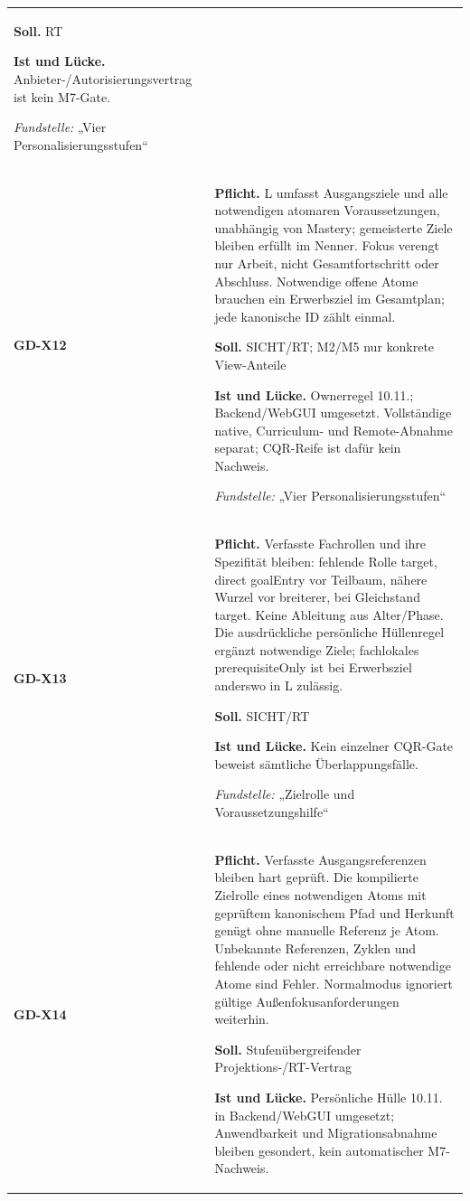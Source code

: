 \begin{longtable}{@{}P{20mm}P{128mm}@{}}
\textbf{Soll.} RT\par\smallskip
\textbf{Ist und Lücke.} Anbieter-/Autorisierungsvertrag ist kein M7-Gate.\par\smallskip
\emph{Fundstelle:} „Vier Personalisierungsstufen“\\\addlinespace[5pt]
\label{rule:GD-X12}\textbf{GD-X12} &
\textbf{Pflicht.} L umfasst Ausgangsziele und alle notwendigen atomaren Voraussetzungen, unabhängig von Mastery; gemeisterte Ziele bleiben erfüllt im Nenner. Fokus verengt nur Arbeit, nicht Gesamtfortschritt oder Abschluss. Notwendige offene Atome brauchen ein Erwerbsziel im Gesamtplan; jede kanonische ID zählt einmal.\par\smallskip
\textbf{Soll.} SICHT/RT; M2/M5 nur konkrete View-Anteile\par\smallskip
\textbf{Ist und Lücke.} Ownerregel 10.11.; Backend/WebGUI umgesetzt. Vollständige native, Curriculum- und Remote-Abnahme separat; CQR-Reife ist dafür kein Nachweis.\par\smallskip
\emph{Fundstelle:} „Vier Personalisierungsstufen“\\\addlinespace[5pt]
\label{rule:GD-X13}\textbf{GD-X13} &
\textbf{Pflicht.} Verfasste Fachrollen und ihre Spezifität bleiben: fehlende Rolle target, direct goalEntry vor Teilbaum, nähere Wurzel vor breiterer, bei Gleichstand target. Keine Ableitung aus Alter/Phase. Die ausdrückliche persönliche Hüllenregel ergänzt notwendige Ziele; fachlokales prerequisiteOnly ist bei Erwerbsziel anderswo in L zulässig.\par\smallskip
\textbf{Soll.} SICHT/RT\par\smallskip
\textbf{Ist und Lücke.} Kein einzelner CQR-Gate beweist sämtliche Überlappungsfälle.\par\smallskip
\emph{Fundstelle:} „Zielrolle und Voraussetzungshilfe“\\\addlinespace[5pt]
\label{rule:GD-X14}\textbf{GD-X14} &
\textbf{Pflicht.} Verfasste Ausgangsreferenzen bleiben hart geprüft. Die kompilierte Zielrolle eines notwendigen Atoms mit geprüftem kanonischem Pfad und Herkunft genügt ohne manuelle Referenz je Atom. Unbekannte Referenzen, Zyklen und fehlende oder nicht erreichbare notwendige Atome sind Fehler. Normalmodus ignoriert gültige Außenfokusanforderungen weiterhin.\par\smallskip
\textbf{Soll.} Stufenübergreifender Projektions-/RT-Vertrag\par\smallskip
\textbf{Ist und Lücke.} Persönliche Hülle 10.11. in Backend/WebGUI umgesetzt; Anwendbarkeit und Migrationsabnahme bleiben gesondert, kein automatischer M7-Nachweis.\par\smallskip

\end{longtable}
